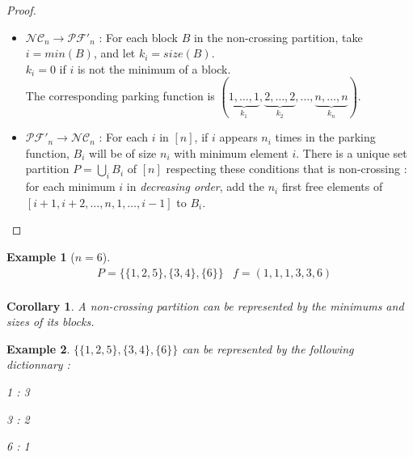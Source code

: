 \documentclass[12pt]{report}
\newtheorem*{example}{Example}
\newtheorem*{cor}{Corollary}
\begin{document}
\begin{proof}
    ~\\
\begin{itemize}
    \item $\mathcal{NC}_n \to \mathcal{PF'}_n$ :
    For each block $B$ in the non-crossing partition, take
    $i = min (B)$, and let $k_i = size (B)$.\\
    $k_i = 0$ if $i$ is not the minimum of a block.\\
    The corresponding parking function is
    $(\underbrace{1, \ldots, 1}_{k_1}, \underbrace{2, \ldots,
    2}_{k_2}, \ldots, \underbrace{n, \ldots, n}_{k_n})$.\\
    \item $\mathcal{PF'}_n \to \mathcal{NC}_n$ :
    For each $i$ in $[n]$, if $i$ appears $n_i$ times in the
    parking function, $B_i$ will be of size $n_i$ with minimum
    element $i$.
    There is a unique set partition $\displaystyle P = \bigcup_{i}{B_i}$
    of $[n]$ respecting these conditions that is non-crossing :
    for each minimum $i$ in \emph{decreasing order}, add
    the $n_i$ first free elements of
    $[i+1, i+2, \ldots, n, 1, \ldots, i-1]$ to $B_i$.
\end{itemize}
\end{proof}

\begin{example}[$n = 6$]
    \begin{align*}
        &P = \{\{1, 2, 5\}, \{3, 4\}, \{6\}\}
        &f = (1, 1, 1, 3, 3, 6)\\
    \end{align*}
\end{example}

\begin{cor}
    A non-crossing partition can be represented by the minimums
    and sizes of its blocks.
\end{cor}

\begin{example}
    $\{\{1, 2, 5\}, \{3, 4\}, \{6\}\}$ can be represented by
    the following dictionnary :\\
    \begin{itemize*}
        \item 1 : 3\\
        \item 3 : 2\\
        \item 6 : 1\\
    \end{itemize*}
\end{example}
\end{document}
